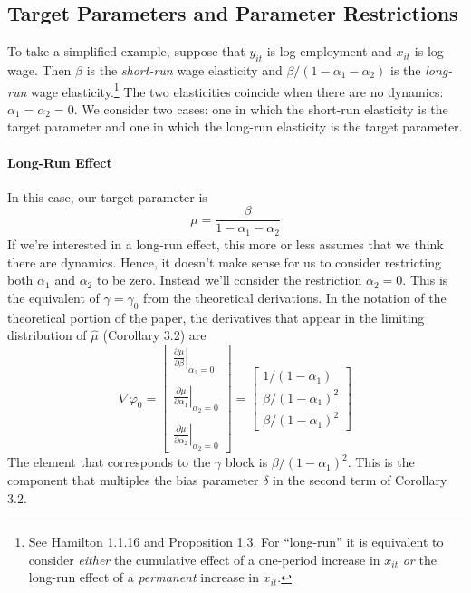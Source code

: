 \documentclass[12pt]{article}
\begin{document}
\subsection{Target Parameters and Parameter Restrictions}
To take a simplified example, suppose that $y_{it}$ is log employment and $x_{it}$ is log wage. Then $\beta$ is the \emph{short-run} wage elasticity and $\beta/(1 - \alpha_1 - \alpha_2)$ is the \emph{long-run} wage elasticity.\footnote{See Hamilton 1.1.16 and Proposition 1.3. For ``long-run'' it is equivalent to consider \emph{either} the cumulative effect of a one-period increase in $x_{it}$ \emph{or} the long-run effect of a \emph{permanent} increase in $x_{it}$.} The two elasticities coincide when there are no dynamics: $\alpha_1 = \alpha_2 = 0$. We consider two cases: one in which the short-run elasticity is the target parameter and one in which the long-run elasticity is the target parameter. 




\paragraph{Long-Run Effect} In this case, our target parameter is
  $$\mu = \frac{\beta}{1 - \alpha_1 - \alpha_2}$$
If we're interested in a long-run effect, this more or less assumes that we think there are dynamics. Hence, it doesn't make sense for us to consider restricting both $\alpha_1$ and $\alpha_2$ to be zero. Instead we'll consider the restriction $\alpha_2 = 0$. This is the equivalent of $\gamma = \gamma_0$ from the theoretical derivations. In the notation of the theoretical portion of the paper, the derivatives that appear in the limiting distribution of $\widehat{\mu}$ (Corollary 3.2) are
  $$\nabla \varphi_0 = \left[\begin{array}{c} \left.\displaystyle\frac{\partial \mu}{\partial \beta}\right|_{\alpha_2 = 0}\\\\
\left.\displaystyle\frac{\partial \mu}{\partial \alpha_1}\right|_{\alpha_2 = 0}\\\\
\left.\displaystyle\frac{\partial \mu}{\partial \alpha_2}\right|_{\alpha_2 = 0}
  \end{array}\right] = \left[\begin{array}{c} 
  1/(1-\alpha_1) \\
  \beta/(1-\alpha_1)^2\\
  \beta/(1-\alpha_1)^2
  \end{array}\right]$$
The element that corresponds to the $\gamma$ block is $\beta/(1-\alpha_1)^2$. This is the component that multiples the bias parameter $\delta$ in the second term of Corollary 3.2.
\end{document}

